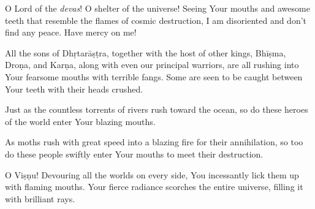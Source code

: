 {O Lord of the \textit{devas}! O shelter of the universe! Seeing Your mouths and awesome teeth that resemble the flames of cosmic destruction, I am disoriented and don't find any peace. Have mercy on me!}

{All the sons of Dhṛtarāṣṭra, together with the host of other kings, Bhīṣma, Droṇa, and Karṇa, along with even our principal warriors, are all rushing into Your fearsome mouths with terrible fangs. Some are seen to be caught between Your teeth with their heads crushed.}

{Just as the countless torrents of rivers rush toward the ocean, so do these heroes of the world enter Your blazing mouths.}

{As moths rush with great speed into a blazing fire for their annihilation, so too do these people swiftly enter Your mouths to meet their destruction.}

{O Viṣṇu! Devouring all the worlds on every side, You incessantly lick them up with flaming mouths. Your fierce radiance scorches the entire universe, filling it with brilliant rays.}

